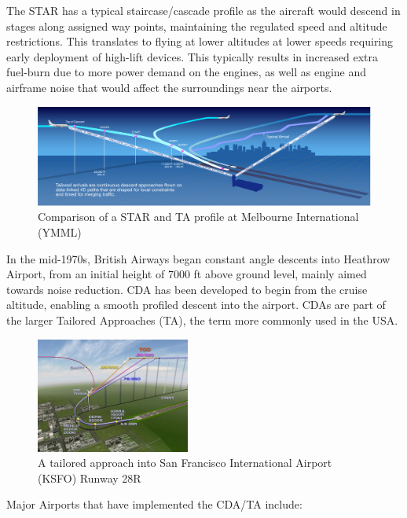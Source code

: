 \documentclass{aer1315-pretty}
\begin{document}
The STAR has a typical staircase/cascade profile as the aircraft would descend in stages along assigned way points, maintaining the regulated speed and altitude restrictions. This translates to flying at lower altitudes at lower speeds requiring early deployment of high-lift devices. This typically results in increased extra fuel-burn due to more power demand on the engines, as well as engine and airframe noise that would affect the surroundings near the airports.\par
\vspace{-0.8mm}
\begin{figure}[!h]
\centering
\includegraphics[width=1\textwidth]{figures/Tailored_Arrivals_YMML.jpg}
	\caption{Comparison of a STAR and TA profile at Melbourne International (YMML)}	
	\label{fig:Compare}
\end{figure}
\vspace{-0.8mm}
In the mid-1970s, British Airways began constant angle descents into Heathrow Airport, from an initial height of 7000 ft above ground level, mainly aimed towards noise reduction. CDA has been developed to begin from the cruise altitude, enabling a smooth profiled descent into the airport. CDAs are part of the larger Tailored Approaches (TA), the term more commonly used in the USA.\par
\begin{figure}
\centering
\includegraphics[width=0.45\textwidth]{figures/ils28R_tailored.jpg}
	\caption{A tailored approach into San Francisco International Airport (KSFO) Runway 28R}	
	\label{fig:KSFO ILS 28R}
\end{figure}
Major Airports that have implemented the CDA/TA include:
\vspace{-2.4mm}
\end{document}
